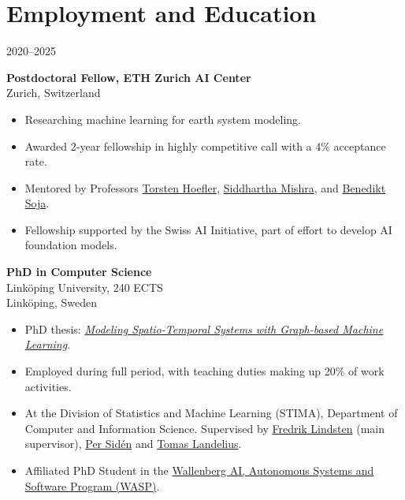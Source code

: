 \section*{Employment and Education}
\newcommand{\employed}[5]{%
\item [#2] \textbf{#1, #3}\\%
    {\footnotesize#4}
    #5
}
\begin{labeling}{2020--2025}
    \employed{Postdoctoral Fellow}{2025 --}{ETH Zurich AI Center}{Zurich, Switzerland}{%
        \begin{itemize}
            \item Researching machine learning for earth system modeling.
            \item Awarded 2-year fellowship in highly competitive call with a 4\% acceptance rate.
            \item Mentored by Professors \href{https://htor.inf.ethz.ch/}{Torsten Hoefler}, \href{https://camlab.ethz.ch/the-group/group-head.html}{Siddhartha Mishra}, and \href{https://space.igp.ethz.ch/people/person-detail.soja.html}{Benedikt Soja}.
            \item Fellowship supported by the Swiss AI Initiative, part of effort to develop AI foundation models.
        \end{itemize}}
\item [2020--2025] \textbf{PhD in Computer Science}\\
        Linköping University, 240 ECTS\\
        {\footnotesize Linköping, Sweden}
        \begin{itemize}
            \item PhD thesis: \href{https://urn.kb.se/resolve?urn=urn:nbn:se:liu:diva-215665}{\textit{Modeling Spatio-Temporal Systems with Graph-based Machine Learning}}.
            \item Employed during full period, with teaching duties making up 20\% of work activities.
            \item At the Division of Statistics and Machine Learning (STIMA), Department of Computer and Information Science. Supervised by \href{https://lindsten.netlify.app/}{Fredrik Lindsten} (main supervisor), \href{https://scholar.google.se/citations?user=0UomzRIAAAAJ}{Per Sidén} and \href{https://www.smhi.se/en/research/research-departments/meteorology/tomas-landelius-1.4817}{Tomas Landelius}.
            \item Affiliated PhD Student in the \href{https://wasp-sweden.org/}{Wallenberg AI, Autonomous Systems and Software Program (WASP)}.

\end{itemize}
\end{labeling}
